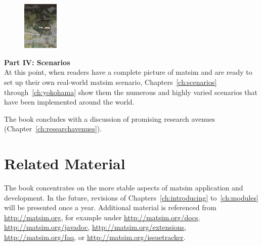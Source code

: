\begin{figure}
\vspace{-10pt}
  \begin{center}
    \includegraphics[width=0.15\textwidth]{images/DSC00233.jpg}
  \end{center}
\end{figure}
\textbf{Part IV: Scenarios}\\
At this point, when readers have a complete picture of \gls{matsim} and are ready to set up their own real-world \gls{matsim} \gls{scenario}, Chapters~\ref{ch:scenarios} through~\ref{ch:yokohama} show them the numerous and highly varied scenarios that have been implemented around the world.

\vskip 1cm
The book concludes with a discussion of promising research avenues (Chapter~\ref{ch:researchavenues}).

\section*{Related Material}

The book concentrates on the more stable aspects of \gls{matsim} application and development.  In the future, revisions of Chapters~\ref{ch:introducing} to~\ref{ch:modules} will be presented once a year.  Additional material is referenced from \url{http://matsim.org}, for example under \url{http://matsim.org/docs}, \url{http://matsim.org/javadoc}, \url{http://matsim.org/extensions}, \url{http://matsim.org/faq}, or \url{http://matsim.org/issuetracker}.




